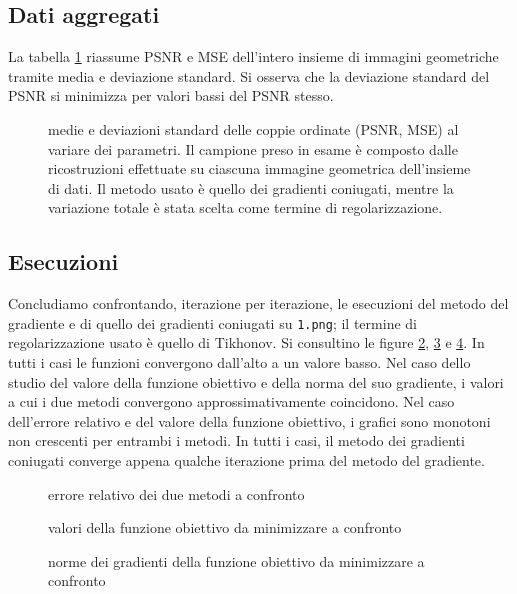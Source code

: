 \documentclass[a4paper]{article}
\begin{document}
\subsection{Dati aggregati}
La tabella \ref{fig:aggregation} riassume PSNR e MSE dell'intero insieme di
immagini geometriche tramite media e deviazione standard.
Si osserva che la deviazione standard del PSNR si minimizza per valori bassi del
PSNR stesso.
\begin{figure}
  \begin{center}
    \scalebox{0.65}{}
  \end{center}
  \caption{medie e deviazioni standard delle coppie ordinate (PSNR, MSE) al
  variare dei parametri. Il campione preso in esame è composto dalle
  ricostruzioni effettuate su ciascuna immagine geometrica dell'insieme di
  dati. Il metodo usato è quello dei gradienti coniugati, mentre la variazione
  totale è stata scelta come termine di regolarizzazione.}
  \label{fig:aggregation}
\end{figure}

\subsection{Esecuzioni}
Concludiamo confrontando, iterazione per iterazione, le esecuzioni del metodo
del gradiente e di quello dei gradienti coniugati su \verb!1.png!; il termine di
regolarizzazione usato è quello di Tikhonov. Si consultino le figure
\ref{fig:iterations-error}, \ref{fig:iterations-objective} e
\ref{fig:iterations-gradient}. In tutti i casi le funzioni convergono dall'alto
a un valore basso. Nel caso dello studio del valore della funzione obiettivo e
della norma del suo gradiente, i valori a cui i due metodi convergono
approssimativamente coincidono. Nel caso dell'errore relativo e del valore della
funzione obiettivo, i grafici sono monotoni non crescenti per entrambi i metodi.
In tutti i casi, il metodo dei gradienti coniugati converge appena qualche
iterazione prima del metodo del gradiente.
\begin{figure}
  \begin{center}
    \scalebox{0.65}{}
  \end{center}
  \caption{errore relativo dei due metodi a confronto}
  \label{fig:iterations-error}
\end{figure}
\begin{figure}
  \begin{center}
    \scalebox{0.65}{}
  \end{center}
  \caption{valori della funzione obiettivo da minimizzare a confronto}
  \label{fig:iterations-objective}
\end{figure}
\begin{figure}
  \begin{center}
    \scalebox{0.65}{}
  \end{center}
  \caption{norme dei gradienti della funzione obiettivo da minimizzare a
  confronto}
  \label{fig:iterations-gradient}
\end{figure}
\end{document}
